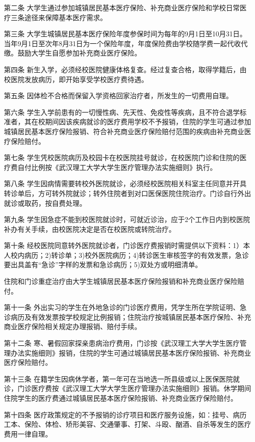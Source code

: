 \documentclass[UTF8,12pt,a4paper]{report}
\begin{document}
第二条 大学生通过参加城镇居民基本医疗保险、补充商业医疗保险和学校日常医疗三条途径来保障基本医疗需求。

第三条 大学生城镇居民基本医疗保险年度参保时间为每年的9月1日至10月31日。当年9月1日至次年8月31日为一个保险年度，年度保险费由学校随学费一起代收代缴。鼓励大学生自愿参加补充商业医疗保险。

第四条 新生入学，必须经校医院健康体格复查。经过复查合格，取得学籍后，由校医院发放病历，即开始享受学校医疗费待遇。

第五条 因体检不合格而保留入学资格回家治疗者，所发生的一切费用自理。

第六条 学生入学前患有的一切慢性病、先天性、免疫性等疾病，且不符合退学标准者，其在校期间因该疾病就诊的医疗费用学校不予报销，住院的学生可通过参加城镇居民基本医疗保险报销、符合补充商业医疗保险赔付范围的疾病由补充商业医疗保险赔付。

第七条 学生凭校医院病历及校园卡在校医院挂号就诊，在校医院门诊和住院的医疗费自付比例按《武汉理工大学大学生医疗管理办法实施细则》执行。

第八条 学生因病情需要转校外医院就诊，必须经校医院相关科室主任同意并开具转诊单后，方可转外院就诊；转外住院者到对口医保医院住院治疗。门诊自行外出就诊或取药，按自费处理。

第九条 学生因急症不能到校医院就诊时，可就近诊治，应于2个工作日内到校医院补办有关手续，由校医院决定是否在校医院或转院治疗。

第十条 经校医院同意转外医院就诊者，门诊医疗费报销时需提供以下资料：1）本人校内病历；2)转诊单；3)校外医院病历；4)转诊医生审核签字的有效发票，急诊要出具盖有“急诊”字样的发票和急诊病历；5)双处方或明细清单。

住院和门诊重症治疗由大学生城镇居民基本医疗保险报销和补充商业医疗保险赔付。

第十一条 外出实习的学生在外地急诊的门诊医疗费用，凭学生所在学院证明、急诊病历及有效发票按学校规定比例报销；住院治疗按城镇居民基本医疗保险、补充商业医疗保险相关规定办理报销、赔付手续。

第十二条 寒、暑假回家探亲患病治疗费用，门诊按《武汉理工大学大学生医疗管理办法实施细则》报销，住院的学生可通过城镇居民基本医疗保险报销、补充商业医疗保险赔付。

第十三条 在籍学生因病休学者，第一年可在当地选一所县级或以上医保医院就诊，门诊医疗费按《武汉理工大学大学生医疗管理办法实施细则》报销。休学期间住院学生的医疗费通过城镇居民基本医疗保险报销、补充商业医疗保险赔付。

第十四条 医疗政策规定的不予报销的诊疗项目和医疗服务设施，如：挂号、病历工本、保险、体检、矫形美容、交通肇事、打架、斗殴、酗酒、自杀等发生的医疗费用一律自理。
\end{document}
